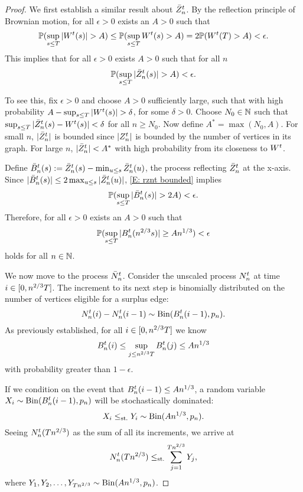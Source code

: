 \begin{proof}
We first establish a similar result about $\bar{Z}^t_n$.
By the reflection principle of Brownian motion, for all $\epsilon>0$ exists an $A>0$ such that
\begin{equation}
\mathbb{P}( \sup_{s\leq T} |W^t(s)| > A ) \leq \mathbb{P}( \sup_{s\leq T} W^t(s) > A ) = 2 \mathbb{P}( W^t(T) > A ) < \epsilon.
\end{equation}
This implies that for all $\epsilon > 0$ exists $A>0$ such that for all $n$
\begin{equation} \label{E: rznt bounded}
\mathbb{P}(\sup_{s \leq T} |\bar{Z}^t_n(s)| > A) < \epsilon.
\end{equation}

To see this, fix $\epsilon > 0$ and choose $A>0$ sufficiently large, 
such that with high probability $A - \sup_{s\leq T} |W^t(s)| > \delta$, for some $\delta > 0$.
Choose $N_0 \in \mathbb{N}$ such that $\sup_{s\leq T} |\bar{Z}^t_n(s) - W^t(s)| < \delta$ for all $n \geq N_0$.
Now define $A^* = \max(N_0, A)$. For small $n$, $|\bar{Z}^t_n|$ is bounded since $|Z_n^t|$ is bounded by the number of vertices in its graph.
For large $n$, $|\bar{Z}^t_n| < A^*$ with high probability from its closeness to $W^t$.

Define $\bar{B}_n^t(s) := \bar{Z}^t_n(s) - \min_{u \leq s}\bar{Z}^t_n(u)$, the process reflecting $\bar{Z}^t_n$ at the x-axis.
Since $|\bar{B}_n^t(s)| \leq 2\max_{u \leq s}|\bar{Z}^t_n(u)|$, \eqref{E: rznt bounded} implies
\begin{equation} \label{E: rzminz bounded}
\mathbb{P}(\sup_{s \leq T} |\bar{B}_n^t(s)| > 2A) < \epsilon.
\end{equation}
Therefore, for all $\epsilon > 0$ exists an $A>0$ such that
\begin{equation}
\mathbb{P}( \sup_{s \leq T} |B_n^t(n^{2 / 3}s)| \geq An^{1 / 3} ) < \epsilon
\end{equation}
holds for all $n \in \mathbb{N}$.

We now move to the process $\bar{N}_n^t$. Consider the unscaled process $N_n^t$ at time $i \in [0, n^{2 / 3}T]$.
The increment to its next step is binomially distributed on the number of vertices eligible for a surplus edge:
\begin{equation}
N_n^t(i) - N_n^t(i-1) \sim \operatorname*{Bin}(B_n^t(i-1), p_n).
\end{equation}
As previously established, for all $i \in [0, n^{2 / 3}T]$ we know 
\begin{equation}
	B_n^t(i) \leq \sup_{j \leq n^{2 / 3}T} B_n^t(j) \leq An^{1 / 3}
\end{equation}
with probability greater than $1-\epsilon$.

If we condition on the event that $B_n^t(i-1) \leq An^{1 / 3}$, a random variable $X_i \sim \operatorname*{Bin}(B_n^t(i-1), p_n)$ will be stochastically dominated:
\begin{equation}
X_i \leq_{\text{st.}} Y_i \sim \operatorname*{Bin}(An^{1 / 3}, p_n).
\end{equation}
Seeing $N_n^t(Tn^{2 / 3})$ as the sum of all its increments, we arrive at
\begin{equation} \label{E: nnt stoch dominance}
N_n^t(Tn^{2 / 3}) \leq_{\text{st.}} \sum_{j=1}^{Tn^{2 / 3}} Y_j,
\end{equation}
where $Y_1, Y_2, \dots, Y_{Tn^{2 / 3}} \sim \operatorname*{Bin}(An^{1 / 3}, p_n)$.


\end{proof}
